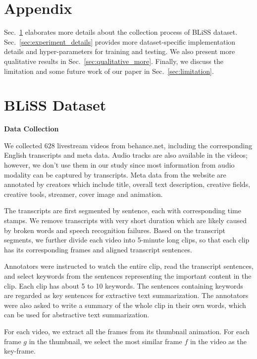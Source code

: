 \appendix
\section*{Appendix}


Sec.~\ref{sec:bliss} elaborates more details about the collection process of BLiSS dataset.
Sec.~\ref{sec:experiment_details} provides more dataset-specific implementation details and hyper-parameters for training and testing.
We also present more qualitative results in Sec.~\ref{sec:qualitative_more}.
Finally, we discuss the limitation and some future work of our paper in Sec.~\ref{sec:limitation}.


\section{BLiSS Dataset}
\label{sec:bliss}

\noindent\textbf{Data Collection}

We collected 628 livestream videos from behance.net, including the corresponding English transcripts and meta data.
Audio tracks are also available in the videos; however, we don't use them in our study since most information from audio modality can be captured by transcripts. Meta data from the website are annotated by creators which include title, overall text description, creative fields, creative tools, streamer, cover image and animation.

The transcripts are first segmented by sentence, each with corresponding time stamps. We remove transcripts with very short duration which are likely caused by broken words and speech recognition failures. Based on the transcript segments, we further divide each video into 5-minute long clips, so that each clip has its corresponding frames and aligned transcript sentences.

Annotators were instructed to watch the entire clip, read the transcript sentences, and select keywords from the sentences representing the important content in the clip. Each clip has about 5 to 10 keywords. The sentences containing keywords are regarded as key sentences for extractive text summarization. The annotators were also asked to write a summary of the whole clip in their own words, which can be used for abstractive text summarization.

For each video, we extract all the frames from its thumbnail animation. 
For each frame $g$ in the thumbnail, we select the most similar frame $f$ in the video as the key-frame.


